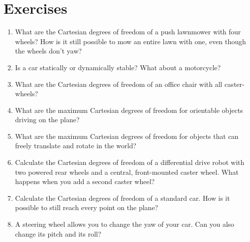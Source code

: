 \section*{Exercises}\small
\begin{enumerate}
\item What are the Cartesian degrees of freedom of a push lawnmower with four wheels? How is it still possible to mow an entire lawn with one, even though the wheels don't yaw?
\item Is a car statically or dynamically stable? What about a motorcycle?
\item What are the Cartesian degrees of freedom of an office chair with all caster-wheels?
\item What are the maximum Cartesian degrees of freedom for orientable objects driving on the plane?
\item What are the maximum Cartesian degrees of freedom for objects that can freely translate and rotate in the world?
\item Calculate the Cartesian degrees of freedom of a differential drive robot with two powered rear wheels and a central, front-mounted caster wheel. What happens when you add a second caster wheel?
\item Calculate the Cartesian degrees of freedom of a standard car. How is it possible to still reach every point on the plane?
\item A steering wheel allows you to change the yaw of your car. Can you also change its pitch and its roll?
\end{enumerate}\normalsize
